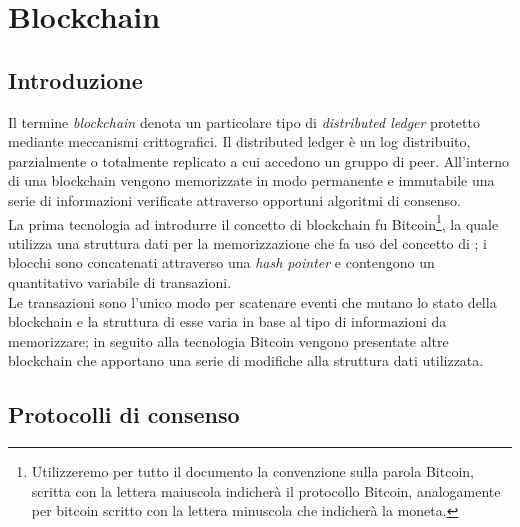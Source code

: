 \chapter{Blockchain}
\label{chap:blockchain}

\section{Introduzione}
\label{sec:introduzione}

Il termine \emph{blockchain} denota un particolare tipo di \emph{distributed ledger} protetto mediante meccanismi crittografici.
Il distributed ledger è un log distribuito, parzialmente o totalmente replicato a cui accedono un gruppo di peer.
All’interno di una blockchain vengono memorizzate in modo permanente e immutabile una serie di informazioni verificate attraverso opportuni algoritmi di consenso.\\
La prima tecnologia ad introdurre il concetto di blockchain fu Bitcoin\footnote{Utilizzeremo per tutto il documento la convenzione sulla parola Bitcoin, scritta con la lettera maiuscola indicherà il protocollo Bitcoin, analogamente per bitcoin scritto con la lettera minuscola che indicherà la moneta.}, la quale utilizza una struttura dati per la memorizzazione che fa uso del concetto di ; i blocchi sono concatenati attraverso una \emph{hash pointer} e contengono un quantitativo variabile di transazioni.\\
Le transazioni sono l'unico modo per scatenare eventi che mutano lo stato della blockchain e la struttura di esse varia in base al tipo di informazioni da memorizzare; in seguito alla tecnologia Bitcoin vengono presentate altre blockchain che apportano una serie di modifiche alla struttura dati utilizzata.


\section{Protocolli di consenso}
\label{sec:protocolloDiConsenso}

